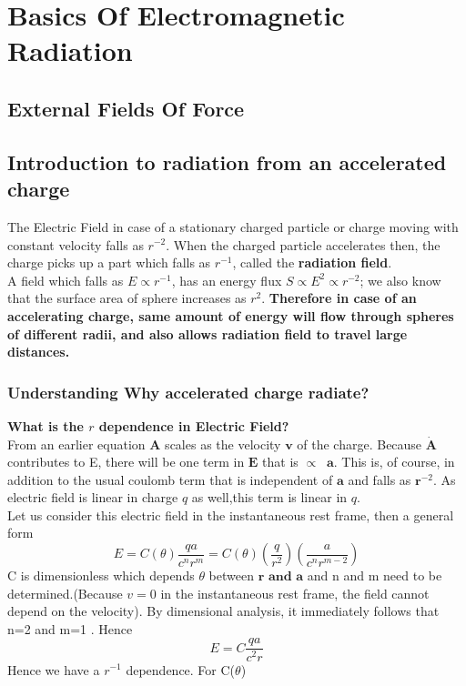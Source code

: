 \documentclass[12pt]{report}
\newcommand{\mbf}[1]{\mathbf{#1}}
\newcommand{\cc}[1]{\left({#1}\right)}
\begin{document}
\section{Basics Of Electromagnetic Radiation}
\subsection{External Fields Of Force}

\subsection{Introduction to radiation from an accelerated charge}
The Electric Field in case of a stationary charged particle or charge moving with constant velocity falls as $r^{-2}$. When the charged particle accelerates then, the charge picks up a part which falls as $r^{-1}$, called the \textbf{radiation field}.\\
A field which falls as $E \propto r^{-1}$, has an energy flux $S \propto E^2 \propto r^{-2}$; we also know that the surface area of sphere increases as $r^2$. \textbf{Therefore in case of an accelerating charge, same amount of energy will flow through spheres of different radii, and also allows radiation field to travel large distances.}
\\
\subsubsection{Understanding Why accelerated charge radiate?}
\textbf{What is the $r$ dependence in Electric Field? }\\
From an earlier equation $\mbf{A}$ scales as the velocity $\mbf{v}$ of the charge. Because $\dot{\mbf{A}}$ contributes to E, there will be one  term in $\mbf{E}$ that is $\propto \; \; \mbf{a}$. This is, of course, in addition to the usual coulomb term that is independent of $\mbf{a}$ and falls as $\mbf{r}^{-2}$. As electric field is linear in charge $q$ as well,this term is linear in $q$. \\

Let us consider this electric field in the instantaneous rest frame, then a general form 
\begin{equation}
E=C(\theta)\frac{qa}{c^nr^m}=C(\theta) \cc{\frac{q}{r^2}}\cc{\frac{a}{c^nr^{m-2}}}
\end{equation}
C is dimensionless which depends $\theta$ between $\mbf{r \text{ and } a}$ and n and m need to be determined.(Because $v=0$ in the instantaneous rest  frame, the field cannot depend on the velocity). By dimensional analysis, it immediately follows that n=2 and m=1 . Hence
\begin{equation}
E=C\frac{qa}{c^2r}
\end{equation}
Hence we have a $r^{-1}$ dependence.
For C($\theta$)
\end{document}
